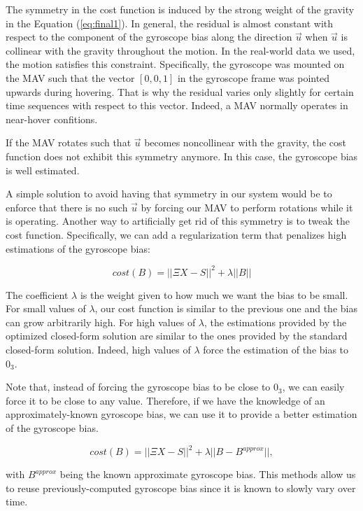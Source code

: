 \documentclass[letterpaper, 10 pt, journal, final]{ieeeconf}  %
\begin{document}
The symmetry in the cost function is induced by the strong weight of the gravity in the Equation (\ref{eq:final1}).
In general, the residual is almost constant with respect to the component of the gyroscope bias along the direction $\vec{u}$ when $\vec{u}$ is collinear with the gravity throughout the motion.
In the real-world data we used, the motion satisfies this constraint.
Specifically, the gyroscope was mounted on the MAV such that the vector $[0,0,1]$ in the gyroscope frame was pointed upwards during hovering.
That is why the residual varies only slightly for certain time sequences with respect to this vector.
Indeed, a MAV normally operates in near-hover confitions.

If the MAV rotates such that $\vec{u}$ becomes noncollinear with the gravity, the cost function does not exhibit this symmetry anymore.
In this case, the gyroscope bias is well estimated.

A simple solution to avoid having that symmetry in our system would be to enforce that there is no such $\vec{u}$ by forcing our MAV to perform rotations while it is operating.
Another way to artificially get rid of this symmetry is to tweak the cost function.
Specifically, we can add a regularization term that penalizes high estimations of the gyroscope bias:

\begin{equation}
cost(B) = ||\Xi X - S||^2 + \lambda ||B||
\end{equation}

The coefficient $\lambda$ is the weight given to how much we want the bias to be small.
For small values of $\lambda$, our cost function is similar to the previous one and the bias can grow arbitrarily high.
For high values of $\lambda$, the estimations provided by the optimized closed-form solution are similar to the ones provided by the standard closed-form solution.
Indeed, high values of $\lambda$ force the estimation of the bias to $0_3$.

Note that, instead of forcing the gyroscope bias to be close to $0_3$, we can easily force it to be close to any value.
Therefore, if we have the knowledge of an approximately-known gyroscope bias, we can use it to provide a better estimation of the gyroscope bias.

\[
cost(B) = ||\Xi X - S||^2 + \lambda ||B - B^{approx}||,
\]

\noindent with $B^{approx}$ being the known approximate gyroscope bias.
This methods allow us to reuse previously-computed gyroscope bias since it is known to slowly vary over time.
\end{document}

